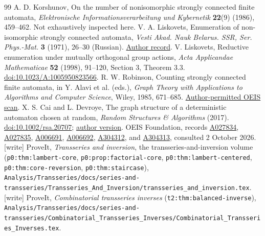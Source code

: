 \documentclass[11pt,letterpaper]{article}
\theoremstyle{remark}\newtheorem{remark}[theorem]{Remark}
\numberwithin{equation}{section}
\begin{document}
\begin{thebibliography}{99}
 A. D. Korshunov, On the number of nonisomorphic strongly connected finite automata, \emph{Elektronische Informationsverarbeitung und Kybernetik} \textbf{22}(9) (1986), 459--462. Not exhaustively inspected here.
 V. A. Liskovets, Enumeration of non-isomorphic strongly connected automata, \emph{Vesti Akad. Nauk Belarus. SSR, Ser. Phys.-Mat.} \textbf{3} (1971), 26--30 (Russian). \href{https://www.researchgate.net/publication/268532943_Enumeration_of_non-isomorphic_strongly_connected_automata}{Author record}.
 V. Liskovets, Reductive enumeration under mutually orthogonal group actions, \emph{Acta Applicandae Mathematicae} \textbf{52} (1998), 91--120, Section 3, Theorem 3.3. \href{https://doi.org/10.1023/A:1005950823566}{doi:10.1023/A:1005950823566}.
 R. W. Robinson, Counting strongly connected finite automata, in Y. Alavi et al. (eds.), \emph{Graph Theory with Applications to Algorithms and Computer Science}, Wiley, 1985, 671--685. \href{https://oeis.org/A006689/a006689_1.pdf}{Author-permitted OEIS scan}.
 X. S. Cai and L. Devroye, The graph structure of a deterministic automaton chosen at random, \emph{Random Structures \& Algorithms} (2017). \href{https://doi.org/10.1002/rsa.20707}{doi:10.1002/rsa.20707}; \href{https://arxiv.org/abs/1504.06238}{author version}.
 OEIS Foundation, records \href{https://oeis.org/A027834}{A027834}, \href{https://oeis.org/A027835}{A027835}, \href{https://oeis.org/A006691}{A006691}, \href{https://oeis.org/A006692}{A006692}, \href{https://oeis.org/A304312}{A304312}, and \href{https://oeis.org/A304313}{A304313}, consulted 2 October 2026.
 [write] ProveIt, \emph{Transseries and inversion}, the transseries-and-inversion volume (\texttt{p0:thm:lambert-core}, \texttt{p0:prop:factorial-core}, \texttt{p0:thm:lambert-centered}, \texttt{p0:thm:core-reversion}, \texttt{p0:thm:staircase}), \nolinkurl{Analysis/Transseries/docs/series-and-transseries/Transseries_And_Inversion/transseries_and_inversion.tex}.
 [write] ProveIt, \emph{Combinatorial transseries inverses} (\texttt{t2:thm:balanced-inverse}), \nolinkurl{Analysis/Transseries/docs/series-and-transseries/Combinatorial_Transseries_Inverses/Combinatorial_Transseries_Inverses.tex}.
\end{thebibliography}\endgroup
\end{document}
